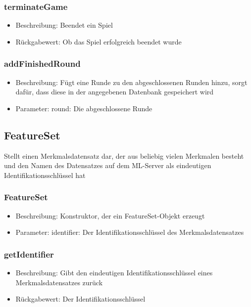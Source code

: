 \documentclass[a4paper]{scrreprt}
\begin{document}
    \subsubsection{terminateGame}
    \begin{itemize}
        \item Beschreibung: Beendet ein Spiel
        \item Rückgabewert: Ob das Spiel erfolgreich beendet wurde
    \end{itemize}
    \subsubsection{addFinishedRound}
    \begin{itemize}
        \item Beschreibung: Fügt eine Runde zu den abgeschlossenen Runden hinzu, sorgt dafür, dass diese in der angegebenen Datenbank gespeichert wird
        \item Parameter: round: Die abgeschlossene Runde
    \end{itemize}

    \subsection{FeatureSet}
    Stellt einen Merkmalsdatensatz dar, der aus beliebig vielen Merkmalen besteht und den Namen des Datensatzes auf dem ML-Server als eindeutigen Identifikationsschlüssel hat
    \subsubsection{FeatureSet}
    \begin{itemize}
        \item Beschreibung: Konstruktor, der ein FeatureSet-Objekt erzeugt
        \item Parameter: identifier: Der Identifikationsschlüssel des Merkmalsdatensatzes
    \end{itemize}
    \subsubsection{getIdentifier}
    \begin{itemize}
        \item Beschreibung: Gibt den eindeutigen Identifikationsschlüssel eines Merkmalsdatensatzes zurück
        \item Rückgabewert: Der Identifikationsschlüssel
    \end{itemize}
\end{document}
